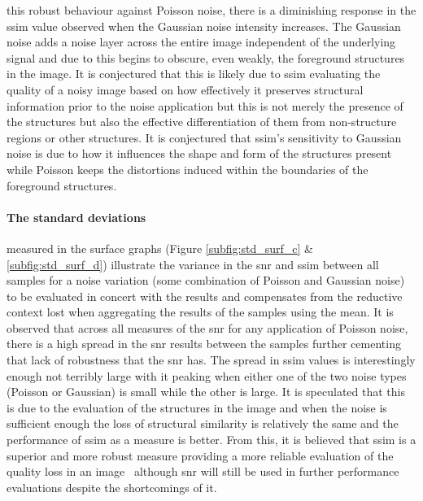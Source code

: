 this robust behaviour against Poisson noise, there is a diminishing response in the \gls{ssim} value observed when the Gaussian noise intensity increases. The Gaussian noise adds a noise layer across the entire image independent of the underlying signal and due to this begins to obscure, even weakly, the foreground structures in the image. It is conjectured that this is likely due to \gls{ssim} evaluating the quality of a noisy image based on how effectively it preserves structural information prior to the noise application but this is not merely the presence of the structures but also the effective differentiation of them from non-structure regions or other structures. It is conjectured that \gls{ssim}'s sensitivity to Gaussian noise is due to how it influences the shape and form of the structures present while Poisson keeps the distortions induced within the boundaries of the foreground structures. \paragraph{The standard deviations} measured in the surface graphs (Figure \ref{subfig:std_surf_c} \& \ref{subfig:std_surf_d}) illustrate the variance in the \gls{snr} and \gls{ssim} between all samples for a noise variation (some combination of Poisson and Gaussian noise) to be evaluated in concert with the results and compensates from the reductive context lost when aggregating the results of the samples using the mean. It is observed that across all measures of the \gls{snr} for any application of Poisson noise, there is a high spread in the \gls{snr} results between the samples further cementing that lack of robustness that the \gls{snr} has. The spread in \gls{ssim} values is interestingly enough not terribly large with it peaking when either one of the two noise types (Poisson or Gaussian) is small while the other is large. It is speculated that this is due to the evaluation of the structures in the image and when the noise is sufficient enough the loss of structural similarity is relatively the same and the performance of \gls{ssim} as a measure is better. From this, it is believed that \gls{ssim} is a superior and more robust measure providing a more reliable evaluation of the quality loss in an image~\cite{snrVSssim} although \gls{snr} will still be used in further performance evaluations despite the shortcomings of it.
